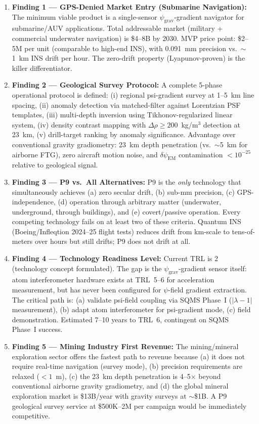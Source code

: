 \documentclass[11pt]{article}
\theoremstyle{definition}
\theoremstyle{remark}
\newcommand{\lambdaone}{|\lambda-1|}
\newcommand{\psigrav}{\psi_{\mathrm{grav}}}
\newcommand{\dpsiem}{\delta\psi_{\mathrm{EM}}}
\newcommand{\drho}{\Delta\rho}
\begin{document}
\begin{enumerate}
\item \textbf{Finding 1 --- GPS-Denied Market Entry (Submarine Navigation):}
  The minimum viable product is a single-sensor $\psigrav$-gradient navigator
  for submarine/AUV applications. Total addressable market (military + commercial
  underwater navigation) is \$4--8B by 2030. MVP price point: \$2--5M per unit
  (comparable to high-end INS), with 0.091~mm precision vs.\ $\sim$1~km INS drift
  per hour. The zero-drift property (Lyapunov-proven) is the killer differentiator.

\item \textbf{Finding 2 --- Geological Survey Protocol:} A complete 5-phase
  operational protocol is defined: (i) regional psi-gradient survey at 1--5~km
  line spacing, (ii) anomaly detection via matched-filter against Lorentzian PSF
  templates, (iii) multi-depth inversion using Tikhonov-regularized linear
  system, (iv) density contrast mapping with $\drho \geq 200$~kg/m$^3$
  detection at 23~km, (v) drill-target ranking by anomaly significance.
  Advantage over conventional gravity gradiometry: 23~km depth penetration
  (vs.\ $\sim$5~km for airborne FTG), zero aircraft motion noise, and
  $\dpsiem$ contamination $< 10^{-25}$ relative to geological signal.

\item \textbf{Finding 3 --- P9 vs.\ All Alternatives:} P9 is the \emph{only}
  technology that simultaneously achieves (a) zero secular drift, (b) sub-mm
  precision, (c) GPS-independence, (d) operation through arbitrary matter
  (underwater, underground, through buildings), and (e) covert/passive operation.
  Every competing technology fails on at least two of these criteria.
  Quantum INS (Boeing/Infleqtion 2024--25 flight tests) reduces drift from
  km-scale to tens-of-meters over hours but still drifts; P9 does not drift at all.

\item \textbf{Finding 4 --- Technology Readiness Level:} Current TRL is 2
  (technology concept formulated). The gap is the $\psigrav$-gradient sensor
  itself: atom interferometer hardware exists at TRL~5--6 for acceleration
  measurement, but has never been configured for $\psi$-field gradient extraction.
  The critical path is: (a) validate psi-field coupling via SQMS Phase~I
  ($\lambdaone$ measurement), (b) adapt atom interferometer for psi-gradient
  mode, (c) field demonstration. Estimated 7--10 years to TRL~6, contingent
  on SQMS Phase~I success.

\item \textbf{Finding 5 --- Mining Industry First Revenue:} The mining/mineral
  exploration sector offers the fastest path to revenue because (a) it does not
  require real-time navigation (survey mode), (b) precision requirements are
  relaxed ($<1$~m), (c) the 23~km depth penetration is 4--5$\times$ beyond
  conventional airborne gravity gradiometry, and (d) the global mineral
  exploration market is \$13B/year with gravity surveys at $\sim$\$1B. A
  P9 geological survey service at \$500K--2M per campaign would be immediately
  competitive.
\end{enumerate}
\end{document}
